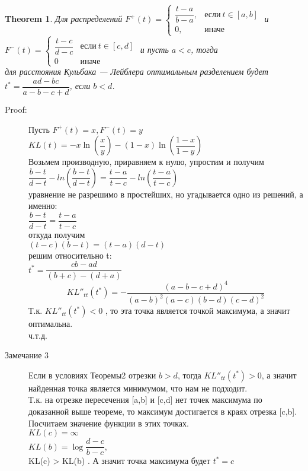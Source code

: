 \documentclass[12 pt, russian]{article}
\newtheorem{theorem}{Theorem}
\begin{document}
\begin{theorem}
  Для распределений $F^+(t) =\begin{cases}
\dfrac{t-a}{b-a},&\text{если$\ t \in [a,b]$}\\
0,&\text{иначе}
\end{cases} $ и\\ $F^-(t) =\begin{cases}
\dfrac{t-c}{d-c}&\text{если$\ t \in [c,d]$}\\
0&\text{иначе}
\end{cases} $ и пусть $a<c$, тогда\\ для расстояния Кульбака — Лейблера  оптимальным разделением будет $t^* = \dfrac{ad-bc}{a-b-c+d}$, если $b<d $.
 \end{theorem}
 \begin{description}
\item[Proof:] 
Пусть $F^+(t) = x, F^-(t)=y$\\
$KL(t) = -x\ln(\dfrac{x}{y}) - (1-x)\ln(\dfrac{1-x}{1-y}) $\\
Возьмем производную, приравняем к нулю, упростим и получим\\
$\dfrac{b-t}{d-t} - ln(\dfrac{b-t}{d-t}) = \dfrac{t-a}{t-c} -ln(\dfrac{t-a}{t-c}) $\\
уравнение не разрешимо в простейших, но угадывается одно из решений, а именно:\\
$\dfrac{b-t}{d-t} = \dfrac{t-a}{t-c}$\\
откуда получим\\
$(t-c)(b-t) = (t-a)(d-t)$\\
решим относительно t:\\
$t^* = \dfrac{cb-ad}{(b+c)-(d+a)}$\\
$$KL''_{tt}(t^*) = -\dfrac{(a-b-c+d)^4}{(a-b)^2(a-c)(b-d)(c-d)^2}$$
Т.к. $KL''_{tt}(t^*)<0$ , то эта точка является точкой максимума, а значит оптимальна.\\
ч.т.д.
\end{description}

\begin{description}
\item[Замечание 3]
Если в условиях Теоремы2 отрезки $b>d$, тогда $KL''_{tt}(t^*)>0$, а значит найденная точка является минимумом, что нам не подходит. \\
Т.к. на отрезке пересечения [a,b] и [c,d] нет точек максимума по доказанной выше теореме, то максимум достигается в краях отрезка [c,b]. Посчитаем значение функции в этих точках.\\
$KL(c) = \infty$\\
$KL(b) = \log{\dfrac{d-c}{b-c}}, $\\
KL(c) > KL(b) . А значит точка максимума будет $t^* = c$

\end{description}
\end{document}
